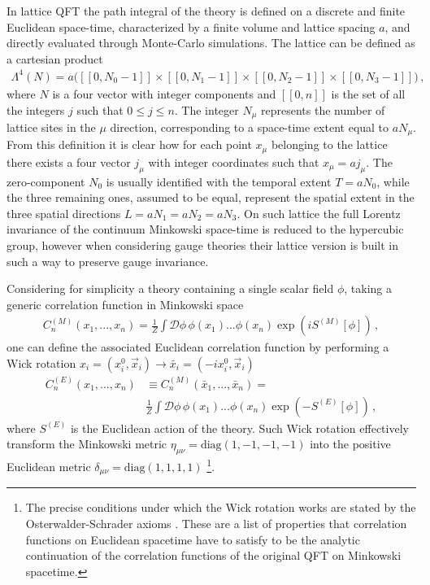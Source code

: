 %
In lattice QFT the path integral of the theory is defined on a discrete and finite Euclidean space-time,
characterized by a finite volume and lattice spacing $a$, and directly evaluated through Monte-Carlo simulations.
The lattice can be defined as a cartesian product
\begin{align}
    \label{eq:lattice_def}
    \Lambda^4\left(N\right) = a\Big([\![0, N_0-1 ]\!]\times[\![0, N_1-1 ]\!]\times[\![0, N_2-1 ]\!]
    \times[\![0, N_3-1 ]\!] \Big)\,,
\end{align}
where $N$ is a four vector with integer components and $[\![0, n ]\!]$ is the set of all the integers $j$ such that
$0 \le j \le n$. The integer $N_{\mu}$ represents the number of lattice sites in the $\mu$ direction, corresponding
to a space-time extent equal to $a N_{\mu}$. 
From this definition it is clear how for each point $x_{\mu}$ belonging to the lattice there exists a four vector $j_{\mu}$ 
with integer coordinates such that $x_{\mu} = a j_{\mu}$. 
The zero-component $N_0$ is usually identified with the temporal extent
$T = a N_0$, while the three remaining ones, assumed to be equal, represent the spatial extent in the three spatial directions
$L = a N_1 = a N_2 = a N_3$. On such lattice the full Lorentz invariance of the continuum 
Minkowski space-time is reduced to the hypercubic group, 
however when considering gauge theories their lattice version is built in such a way to preserve gauge invariance. 

Considering for simplicity a theory containing a single scalar field $\phi$,
taking a generic correlation function in Minkowski space 
\begin{align}
    C_n^{(M)}\left(x_1,..., x_n\right) = 
    \frac{1}{Z} \int \mathcal{D}\phi\, \phi\left(x_1\right)...\phi\left(x_n\right)\exp\left(i S^{(M)}\left[\phi\right]\right)\,,
\end{align}
one can define the associated Euclidean correlation function
by performing a Wick rotation $x_i = \left(x^0_i, \vec{x}_i\right) \rightarrow \bar{x}_i = \left(-i x^0_i, \vec{x}_i\right)$
\begin{align}
    \label{eq:euclidean_correlator}
    C_n^{(E)}\left(x_1,..., x_n\right) &\equiv C_n^{(M)}\left(\bar{x}_1,..., \bar{x}_n\right) = \nonumber \\
    &\frac{1}{Z} \int \mathcal{D}\phi\, \phi\left(x_1\right)...\phi\left(x_n\right)\exp\left(- S^{(E)}\left[\phi\right]\right)\,,
\end{align}
where $S^{(E)}$ is the Euclidean action of the theory.
Such Wick rotation effectively transform the Minkowski metric $\eta_{\mu\nu} = \text{diag}\left(1,-1,-1,-1\right)$
into the positive Euclidean metric $\delta_{\mu\nu} = \text{diag}\left(1,1,1,1\right)$
\footnote{The precise conditions under which the Wick rotation works are stated by the 
Osterwalder-Schrader axioms \cite{cmp/1103858969}. These are a list of properties
that correlation functions on Euclidean spacetime have to satisfy to be the analytic continuation of
the correlation functions of the original QFT on Minkowski spacetime.}.

